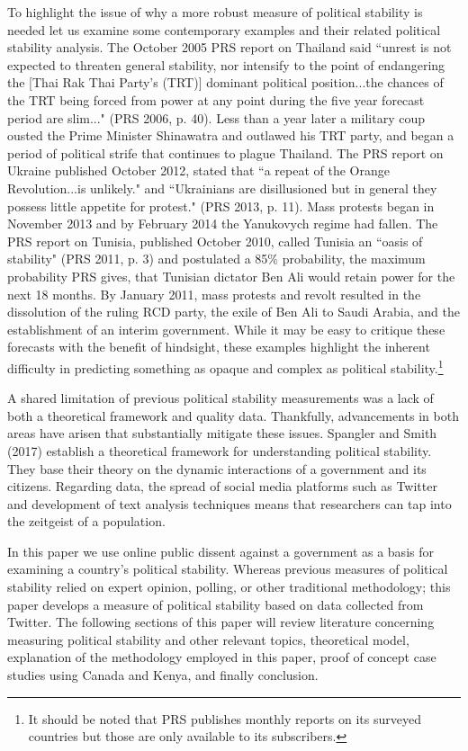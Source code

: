 \documentclass[12pt]{article}
\begin{document}
\begin{spacing}{1.5}
To highlight the issue of why a more robust measure of political stability is needed let us examine some contemporary examples and their related political stability analysis. The October 2005 PRS report on Thailand said ``unrest is not expected to threaten general stability, nor intensify to the point of endangering the [Thai Rak Thai Party's (TRT)] dominant political position...the chances of the TRT being forced from power at any point during the five year forecast period are slim..." (PRS 2006, p. 40). Less than a year later a military coup ousted the Prime Minister Shinawatra and outlawed his TRT party, and began a period of political strife that continues to plague Thailand. The PRS report on Ukraine published October 2012, stated that ``a repeat of the Orange Revolution...is unlikely." and ``Ukrainians are disillusioned but in general they possess little appetite for protest." (PRS 2013, p. 11). Mass protests began in November 2013 and by February 2014 the Yanukovych regime had fallen. The PRS report on Tunisia, published October 2010, called Tunisia an ``oasis of stability" (PRS 2011, p. 3) and postulated a 85\% probability, the maximum probability PRS gives, that Tunisian dictator Ben Ali would retain power for the next 18 months. By January 2011, mass protests and revolt resulted in the dissolution of the ruling RCD party, the exile of Ben Ali to Saudi Arabia, and the establishment of an interim government. While it may be easy to critique these forecasts with the benefit of hindsight, these examples highlight the inherent difficulty in predicting something as opaque and complex as political stability.\footnote{It should be noted that PRS publishes monthly reports on its surveyed countries but those are only available to its subscribers.} 

A shared limitation of previous political stability measurements was a lack of both a theoretical framework and quality data. Thankfully, advancements in both areas have arisen that substantially mitigate these issues. Spangler and Smith (2017) establish a theoretical framework for understanding political stability. They base their theory on the dynamic interactions of a government and its citizens. Regarding data, the spread of social media platforms such as Twitter and development of text analysis techniques means that researchers can tap into the zeitgeist of a population.

In this paper we use online public dissent against a government as a basis for examining a country's political stability. Whereas previous measures of political stability relied on expert opinion, polling, or other traditional methodology; this paper develops a measure of political stability based on data collected from Twitter. The following sections of this paper will review literature concerning measuring political stability and other relevant topics, theoretical model, explanation of the methodology employed in this paper, proof of concept case studies using Canada and Kenya, and finally conclusion. 


\end{spacing}
\end{document}
